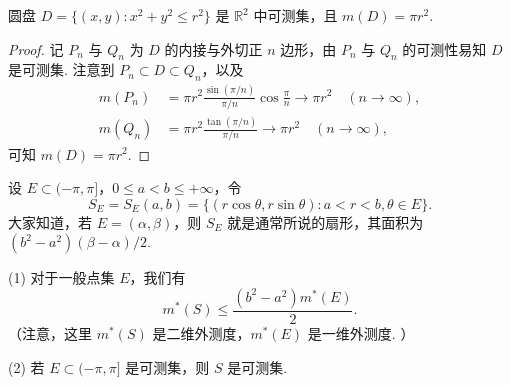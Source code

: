 \documentclass[../../main.tex]{subfiles}
\begin{document}
\begin{example}
圆盘 \(D = \{ (x,y): x^2 + y^2 \leqslant r^2\}\) 是 \(\mathbb{R}^2\) 中可测集，且 \(m(D)=\pi r^2\).
\end{example}
\begin{proof}
记 \(P_n\) 与 \(Q_n\) 为 \(D\) 的内接与外切正 \(n\) 边形，由 \(P_n\) 与 \(Q_n\) 的可测性易知 \(D\) 是可测集. 注意到 \(P_n \subset D \subset Q_n\)，以及
\begin{align*}
m(P_n) &= \pi r^2 \frac{\sin(\pi/n)}{\pi/n} \cos\frac{\pi}{n} \to \pi r^2 \quad (n \to \infty),\\
m(Q_n) &= \pi r^2 \frac{\tan(\pi/n)}{\pi/n} \to \pi r^2 \quad (n \to \infty),
\end{align*}
可知 \(m(D)=\pi r^2\).
\end{proof}

\begin{example}\label{example:极坐标变换与可测性}
设 \(E \subset (-\pi, \pi]\)，\(0 \leqslant a < b \leqslant +\infty\)，令
\[
S_E = S_E(a,b)=\{(r\cos\theta, r\sin\theta): a < r < b, \theta \in E\}.
\]
大家知道，若 \(E = (\alpha, \beta)\)，则 \(S_E\) 就是通常所说的扇形，其面积为 \((b^2 - a^2)(\beta - \alpha)/2\).

(1) 对于一般点集 \(E\)，我们有
\[
m^*(S) \leqslant \frac{(b^2 - a^2)m^*(E)}{2}.
\]
（注意，这里 \(m^*(S)\) 是二维外测度，\(m^*(E)\) 是一维外测度. ）

(2) 若 \(E \subset (-\pi, \pi]\) 是可测集，则 \(S\) 是可测集.
\end{example}
\end{document}

